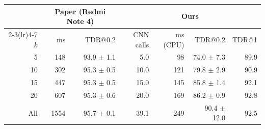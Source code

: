 \begin{tabular}{r rr rrrr}
\toprule
 & \multicolumn{2}{c}{Paper (Redmi Note 4)} & \multicolumn{4}{c}{Ours} \\
\cmidrule(lr){2-3}\cmidrule(lr){4-7}
$k$ & ms & TDR@0.2 & CNN calls & ms (CPU) & TDR@0.2 & TDR@1 \\
\midrule
5 & 148 & 93.9 $\pm$ 1.1 & 5.0 & 98 & 74.0 $\pm$ 7.3 & 89.9 \\
10 & 302 & 95.3 $\pm$ 0.5 & 10.0 & 121 & 79.8 $\pm$ 2.9 & 90.9 \\
15 & 447 & 95.3 $\pm$ 0.5 & 15.0 & 145 & 85.8 $\pm$ 1.4 & 92.1 \\
20 & 607 & 95.3 $\pm$ 0.6 & 20.0 & 169 & 86.2 $\pm$ 0.9 & 92.8 \\
All & 1554 & 95.7 $\pm$ 0.1 & 39.1 & 249 & 90.4 $\pm$ 12.0 & 92.5 \\
\bottomrule
\end{tabular}
